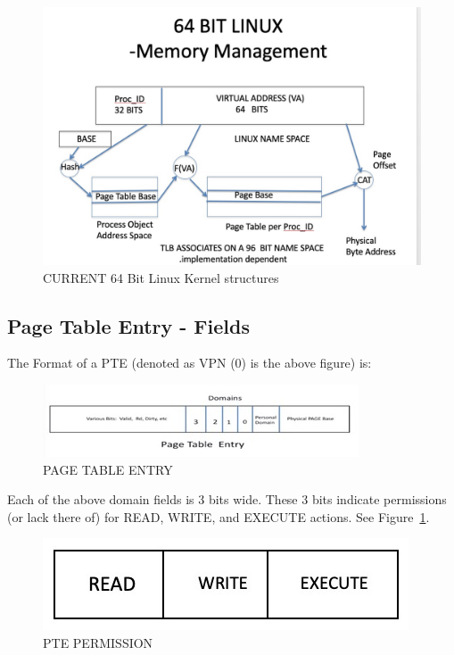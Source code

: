 \documentclass{article}
\begin{document}
\begin{figure}[h]
\begin{center}
\includegraphics[scale=.3]{figures/96_bit_linux.jpg}
\caption{CURRENT 64 Bit Linux Kernel structures}
\end{center}
\end{figure}

\pagebreak

\subsection{Page Table Entry - Fields}

The Format of a PTE (denoted as VPN (0) is the above figure) is:

\begin{figure}[h]
\begin{center}
\includegraphics[scale=.8]{figures/figure2b_pte.jpg}
\caption{PAGE TABLE ENTRY}
\end{center}
\end{figure}

Each of the above domain fields is 3 bits wide.  These 3 bits indicate permissions (or lack there of) for READ, WRITE,  and EXECUTE actions.  See Figure~\ref{fig:ptepermissions}.  

\begin{figure}[h]\begin{center}
\includegraphics[scale=.4]
{figures/2019_jan_new_5a_pte_pernissions.jpg}
\caption{PTE PERMISSION}
\label{fig:ptepermissions}
\centering
\end{center}
\end{figure}
\end{document}
